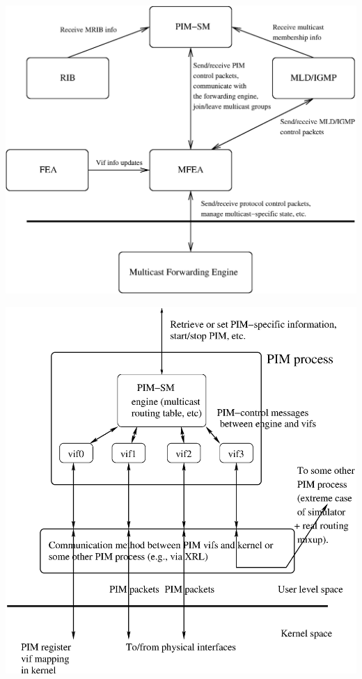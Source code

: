 \documentclass[landscape]{icsislides}
\begin{document}
\begin{slide}

\begin{center}
  \includegraphics[width=6.0in]{figs/mcast_modules_interaction}
\end{center}

\end{slide}

\begin{slide}

\begin{center}
  \includegraphics[width=5.5in]{figs/mcast_proto_abstraction}
\end{center}

\end{slide}
\end{document}
